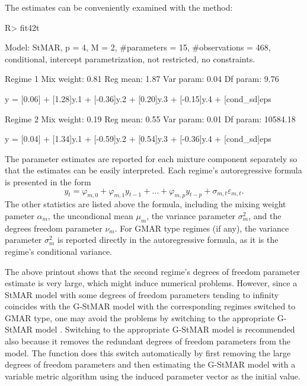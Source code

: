 \documentclass[nojss]{jss} %
\begin{document}
The estimates can be conveniently examined with the  method:
%
\begin{CodeChunk}
\begin{CodeInput}
R> fit42t
\end{CodeInput}
\begin{CodeOutput}
Model:
 StMAR, p = 4, M = 2, #parameters = 15, #observations = 468,
 conditional, intercept parametrization, not restricted, no constraints.

Regime 1
Mix weight: 0.81
Reg mean: 1.87
Var param: 0.04
Df param: 9.76

y = [0.06] + [1.28]y.1 + [-0.36]y.2 + [0.20]y.3 + [-0.15]y.4 + [cond_sd]eps

Regime 2
Mix weight: 0.19
Reg mean: 0.55
Var param: 0.01
Df param: 10584.18

y = [0.04] + [1.34]y.1 + [-0.59]y.2 + [0.54]y.3 + [-0.36]y.4 + [cond_sd]eps
\end{CodeOutput}
\end{CodeChunk}
%
The parameter estimates are reported for each mixture component separately so that the estimates can be easily interpreted. Each regime's autoregressive formula is presented in the form
\begin{equation}
y_t = \varphi_{m,0} + \varphi_{m,1}y_{t - 1} + ... + \varphi_{m,p}y_{t - p} + \sigma_{m,t}\varepsilon_{m,t}.
\end{equation}
The other statistics are listed above the formula, including the mixing weight pameter $\alpha_m$, the uncondional mean $\mu_m$, the variance parameter $\sigma_m^2$, and the degrees freedom parameter $\nu_m$. For GMAR type regimes (if any), the variance parameter $\sigma_m^2$ is reported directly in the autoregressive formula, as it is the regime's conditional variance.

The above printout shows that the second regime's degrees of freedom parameter estimate is very large, which might induce numerical problems. However, since a StMAR model with some degrees of freedom parameters tending to infinity coincides with the G-StMAR model with the corresponding regimes switched to GMAR type, one may avoid the problems by switching to the appropriate G-StMAR model \citep[Section 4]{Virolainen:2020}. Switching to the appropriate G-StMAR model is recommended also because it removes the redundant degrees of freedom parameters from the model. The function  does this switch automatically by first removing the large degrees of freedom parameters and then estimating the G-StMAR model with a variable metric algorithm \citep[algorithm 21]{Nash:1990} using the induced parameter vector as the initial value.
\end{document}
